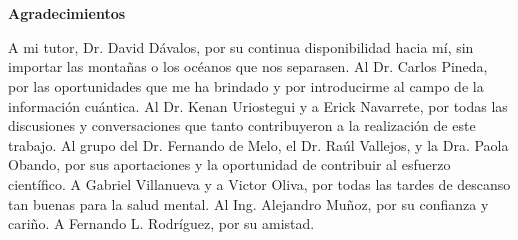 \section*{}
\vspace{6cm}
\textbf{\Large Agradecimientos}
\newline

A mi tutor, Dr. David Dávalos, por su continua disponibilidad hacia mí, sin importar las montañas o los océanos que nos separasen. 
%
Al Dr. Carlos Pineda, por las oportunidades que me ha brindado y por introducirme al campo de la información cuántica.
%
Al Dr. Kenan Uriostegui y a Erick Navarrete, por todas las discusiones y conversaciones que tanto contribuyeron a la realización de este trabajo. 
%
Al grupo del Dr. Fernando de Melo, el Dr. Raúl Vallejos, y la Dra. Paola Obando, por sus aportaciones y la oportunidad de contribuir al esfuerzo científico.
%
A Gabriel Villanueva y a Victor Oliva, por todas las tardes de descanso tan buenas para la salud mental.
%
Al Ing. Alejandro Muñoz, por su confianza y cariño. 
%
A Fernando L. Rodríguez, por su amistad.